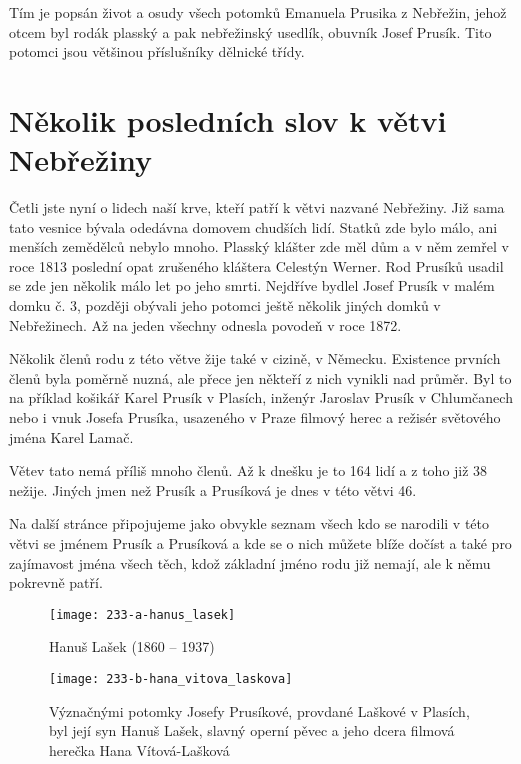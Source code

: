 \documentclass[../dejiny-rodu-prusiku.tex]{subfiles}
\begin{document}
Tím je popsán život a osudy všech potomků Emanuela Prusika z Nebřežin, jehož otcem byl rodák plasský a pak nebřežinský usedlík, obuvník Josef Prusík. Tito potomci jsou většinou příslušníky dělnické třídy.

\section{Několik posledních slov k větvi Nebřežiny}

Četli jste nyní o lidech naší krve, kteří patří k větvi nazvané Nebřežiny. Již sama tato vesnice bývala odedávna domovem chudších lidí. Statků zde bylo málo, ani menších zemědělců nebylo mnoho. Plasský klášter zde měl dům a v něm zemřel v roce 1813 poslední opat zru­šeného kláštera Celestýn Werner. Rod Prusíků usadil se zde jen několik málo let po jeho smrti. Nejdříve bydlel Josef Prusík v malém domku č. 3, později obývali jeho potomci ještě několik jiných domků v Nebřežinech. Až na jeden všechny odnesla povodeň v roce 1872.

Několik členů rodu z této větve žije také v cizině, v Německu. Existence prvních členů byla poměrně nuzná, ale přece jen někteří z nich vynikli nad průměr. Byl to na příklad košikář  Karel Prusík v Plasích, inženýr Jaroslav Prusík v Chlumčanech nebo i vnuk Josefa Prusíka, usazeného v Praze filmový herec a režisér světového jména Karel Lamač.

Větev tato nemá příliš mnoho členů. Až k dnešku je to 164 lidí a z toho již 38 nežije. Jiných jmen než Prusík a Prusíková je dnes v této větvi 46.

Na další stránce připojujeme jako obvykle seznam všech kdo se narodili v této větvi se jménem Prusík a Prusíková a kde se o nich můžete blíže dočíst a také pro zajímavost jména všech těch, kdož základní jméno rodu již nemají, ale k němu pokrevně patří.


\begin{figure}
\centering
\texttt{[image: 233-a-hanus\_lasek]}
\caption{Hanuš Lašek (1860 – 1937)}
\label{fig:233-a-hanus_lasek}
\end{figure}

             \begin{figure}
\centering
\texttt{[image: 233-b-hana\_vitova\_laskova]}
\caption{Význačnými potomky Josefy Prusíkové, provdané Laškové v Plasích, byl její syn Hanuš Lašek, slavný operní pěvec a jeho dcera filmová herečka Hana Vítová-Lašková }
\label{fig:233-b-hana_vitova_laskova}
\end{figure}
\end{document}
